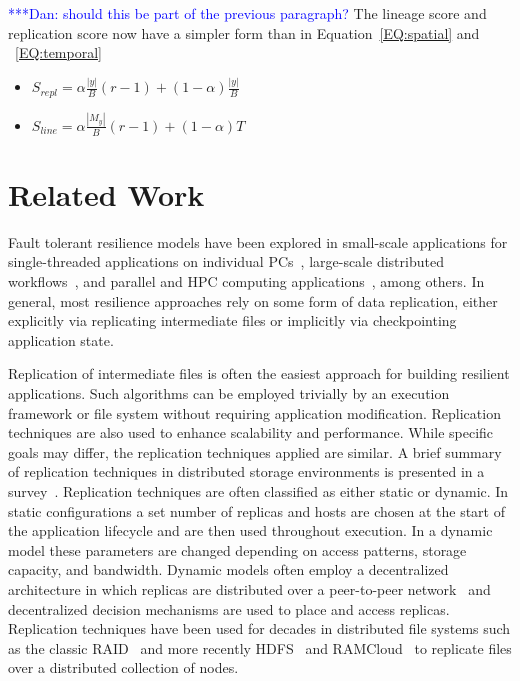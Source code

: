 \documentclass{sig-alternate}
\newcommand{\iannote}[1]{ {\textcolor{red}    { ***Ian:      #1 }}}
\newcommand{\katznote}[1]{ {\textcolor{blue}    { ***Dan:      #1 }}}
\newcommand{\zhaonote}[1]{{\textcolor{cyan}    { ***Zhao:      #1 }}}
\newcommand{\iannote}[1]{}
\newcommand{\katznote}[1]{}
\newcommand{\zhaonote}[1]{}
\begin{document}
\katznote{should this be part of the previous paragraph?}
The lineage score and replication score now have a simpler form than in Equation~\ref{EQ:spatial} and ~\ref{EQ:temporal}
\begin{itemize}
  \item[] $S_{repl} = \alpha\frac{|y|}{B}(r-1) + (1-\alpha)\frac{|y|}{B} $
  \item[] $S_{line} = \alpha\frac{|M_y|}{B}(r-1) + (1-\alpha)T$
\end{itemize}


\section{Related Work}
\label{sec:Related}
Fault tolerant resilience models have been explored in small-scale applications for single-threaded applications on individual PCs~\cite{condor1988, libckpt1994}, large-scale distributed workflows~\cite{uncoordinated2010}, and parallel and HPC computing applications~\cite{mist1995, consistent1994,FTworkshop2009}, among others. In  general, most resilience approaches rely on some form of data replication, either explicitly via replicating intermediate files or implicitly via checkpointing application state.

Replication of intermediate files is often the easiest approach for building resilient applications. Such algorithms can be employed trivially by an execution framework or file system without requiring application modification. Replication techniques are also used to enhance scalability and performance. While specific goals may differ, the replication techniques applied are similar. A brief summary of replication techniques in distributed storage environments is presented in a survey~\cite{survey2012}. Replication techniques are often classified as either static or dynamic. In static configurations a set number of replicas and hosts are chosen at the start of the application lifecycle and are then used throughout execution. In a dynamic model these parameters are changed depending on access patterns, storage capacity, and bandwidth.  Dynamic models often employ a decentralized architecture in which replicas are distributed over a peer-to-peer network~\cite{chord} and decentralized decision mechanisms are used to place and access replicas. Replication techniques have been used for decades in distributed file systems such as the classic RAID~\cite{raid1988} and more recently HDFS~\cite{HDFS} and RAMCloud~\cite{ramcloud2010, ramcloud2014} to replicate files over a distributed collection of nodes.
\end{document}
